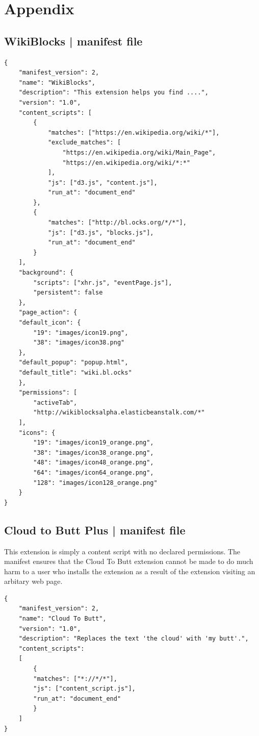 \documentclass[a4paper, 11pt]{article} %
\begin{document}
\section{Appendix}

\subsection{WikiBlocks | manifest file}

\begin{lstlisting}
{
	"manifest_version": 2,
	"name": "WikiBlocks",
	"description": "This extension helps you find ....",
	"version": "1.0",
	"content_scripts": [
		{
			"matches": ["https://en.wikipedia.org/wiki/*"],
			"exclude_matches": [
				"https://en.wikipedia.org/wiki/Main_Page",
				"https://en.wikipedia.org/wiki/*:*"
			],
			"js": ["d3.js", "content.js"],
			"run_at": "document_end"
		},
		{
			"matches": ["http://bl.ocks.org/*/*"],
			"js": ["d3.js", "blocks.js"],
			"run_at": "document_end"
		}
	],
	"background": {
		"scripts": ["xhr.js", "eventPage.js"],
		"persistent": false
	},
	"page_action": {
	"default_icon": {
		"19": "images/icon19.png",
		"38": "images/icon38.png"
	},
	"default_popup": "popup.html",
	"default_title": "wiki.bl.ocks"
	},
	"permissions": [
		"activeTab",
		"http://wikiblocksalpha.elasticbeanstalk.com/*"
	],
	"icons": {
		"19": "images/icon19_orange.png",
		"38": "images/icon38_orange.png",
		"48": "images/icon48_orange.png",
		"64": "images/icon64_orange.png",
		"128": "images/icon128_orange.png"
	}
}
\end{lstlisting}

\eject

\subsection{Cloud to Butt Plus | manifest file}

This extension is simply a content script with no declared permissions. The manifest ensures that the Cloud To Butt extension cannot be made to do much harm to a user who installs the extension as a result of the extension visiting an arbitary web page. \cite{Cloud45:online}

\begin{lstlisting}
{
	"manifest_version": 2,
	"name": "Cloud To Butt",
	"version": "1.0",
	"description": "Replaces the text 'the cloud' with 'my butt'.",
	"content_scripts": 
	[
		{
		"matches": ["*://*/*"],
		"js": ["content_script.js"],
		"run_at": "document_end"
		}
	]
}
\end{lstlisting}





\eject 



\end{document}
